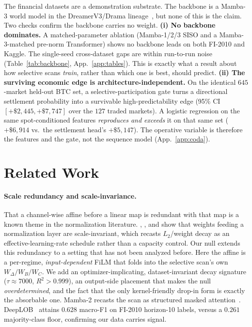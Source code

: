 \documentclass{article}
\begin{document}
The financial datasets are a demonstration substrate. The backbone is a Mamba-3
world model in the DreamerV3/Drama lineage~\citep{hafner2023dreamerv3, wang2024drama},
but none of this is the claim. Two checks confirm the backbone carries no weight.
\textbf{(i) No backbone dominates.} A matched-parameter ablation (Mamba-1/2/3 SISO
and a Mamba-3-matched pre-norm Transformer) shows no backbone leads on both
FI-2010 and Kaggle. The single-seed cross-dataset gaps are within run-to-run noise
(Table~\ref{tab:backbone}, App.~\ref{app:tables}). This is exactly what a result
about how selective scans \emph{train}, rather than which one is best, should
predict. \textbf{(ii) The surviving economic edge is architecture-independent.} On the
identical $645$-market held-out BTC set, a selective-participation gate turns a
directional settlement probability into a survivable high-predictability edge (95\%
CI $[+\$2{,}445,+\$7{,}747]$ over the $127$ traded markets). A logistic regression
on the same spot-conditioned features \emph{reproduces and exceeds} it on that same
set ($+\$6{,}914$ vs.\ the settlement head's $+\$5{,}147$). The operative
variable is therefore the features and the gate, not the sequence model
(App.~\ref{app:coda}).

\section{Related Work}\label{sec:related}

\paragraph{Scale redundancy and scale-invariance.}
That a channel-wise affine before a linear map is redundant with that map is a
known theme in the normalization literature. \citet{vanlaarhoven2017l2},
\citet{hoffer2018norm}, and \citet{li2020exp} show that weights feeding a
normalization layer are scale-invariant, which recasts $L_2$/weight decay as an
effective-learning-rate schedule rather than a capacity control. Our null extends
this redundancy to a setting that has not been analyzed before. Here the affine is
a per-regime, \emph{input-dependent} FiLM that folds into the selective scan's own
$W_\Delta/W_B/W_C$. We add an optimizer-implicating, dataset-invariant decay
signature ($\tau\approx7000$, $R^2>0.999$), an output-side placement that makes
the null \emph{overdetermined}, and the fact that the only kernel-friendly
drop-in form is exactly the absorbable one. Mamba-2 recasts the scan as structured
masked attention~\citep{dao2024mamba2}. DeepLOB~\citep{zhang2019deeplob} attains
$0.628$ macro-F1 on FI-2010 horizon-10 labels, versus a $0.261$ majority-class
floor, confirming our data carries signal.
\end{document}
